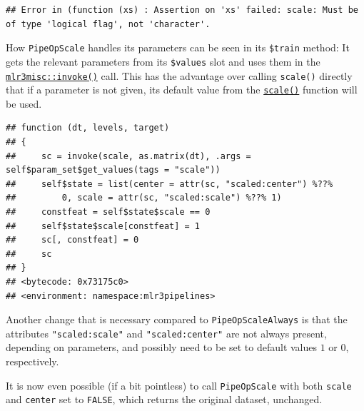 \documentclass[]{scrbook}
\newenvironment{Shaded}{\begin{snugshade}}{\end{snugshade}}
\newcommand{\DecValTok}[1]{\textcolor[rgb]{0.00,0.00,0.81}{#1}}
\newcommand{\KeywordTok}[1]{\textcolor[rgb]{0.13,0.29,0.53}{\textbf{#1}}}
\newcommand{\NormalTok}[1]{#1}
\newcommand{\OperatorTok}[1]{\textcolor[rgb]{0.81,0.36,0.00}{\textbf{#1}}}
\newcommand{\OtherTok}[1]{\textcolor[rgb]{0.56,0.35,0.01}{#1}}
\newcommand{\StringTok}[1]{\textcolor[rgb]{0.31,0.60,0.02}{#1}}
\renewenvironment{Shaded} {\begin{snugshade}\small} {\end{snugshade}}
\begin{document}
\begin{verbatim}
## Error in (function (xs) : Assertion on 'xs' failed: scale: Must be of type 'logical flag', not 'character'.
\end{verbatim}

How \texttt{PipeOpScale} handles its parameters can be seen in its \texttt{\$train} method: It gets the relevant parameters from its \texttt{\$values} slot and uses them in the \href{https://mlr3misc.mlr-org.com/reference/invoke.html}{\texttt{mlr3misc::invoke()}} call.
This has the advantage over calling \texttt{scale()} directly that if a parameter is not given, its default value from the \href{https://www.rdocumentation.org/packages/base/topics/scale}{\texttt{scale()}} function will be used.

\begin{Shaded}
\end{Shaded}

\begin{verbatim}
## function (dt, levels, target) 
## {
##     sc = invoke(scale, as.matrix(dt), .args = self$param_set$get_values(tags = "scale"))
##     self$state = list(center = attr(sc, "scaled:center") %??% 
##         0, scale = attr(sc, "scaled:scale") %??% 1)
##     constfeat = self$state$scale == 0
##     self$state$scale[constfeat] = 1
##     sc[, constfeat] = 0
##     sc
## }
## <bytecode: 0x73175c0>
## <environment: namespace:mlr3pipelines>
\end{verbatim}

Another change that is necessary compared to \texttt{PipeOpScaleAlways} is that the attributes \texttt{"scaled:scale"} and \texttt{"scaled:center"} are not always present, depending on parameters, and possibly need to be set to default values \(1\) or \(0\), respectively.

It is now even possible (if a bit pointless) to call \texttt{PipeOpScale} with both \texttt{scale} and \texttt{center} set to \texttt{FALSE}, which returns the original dataset, unchanged.

\begin{Shaded}
\end{Shaded}
\end{document}
